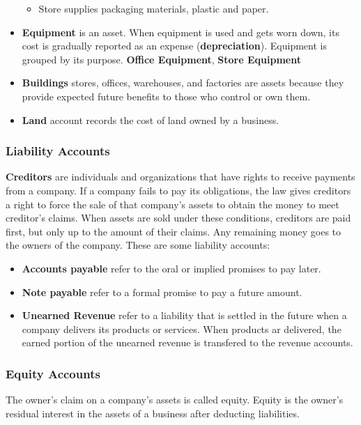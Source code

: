 \documentclass[../main.tex]{subfiles}
\begin{document}
\begin{itemize}[noitemsep]
\begin{itemize}[noitemsep]
			\item Store supplies \eg packaging materials, plastic and paper. 
		\end{itemize}
		\item \textbf{Equipment} is an asset. When equipment is used and gets 
		worn down, its cost is gradually reported as an expense 
		(\textbf{depreciation}). Equipment is grouped by its purpose. \eg 
		\textbf{Office Equipment}, \textbf{Store Equipment}
		\item \textbf{Buildings} \eg stores, offices, warehouses, and 
		factories are assets because they provide expected future benefits to 
		those who control or own them. 
		\item \textbf{Land} account records the cost of land owned by a 
		business. 
	\end{itemize}
	
	\subsubsection{Liability Accounts} 
	
	\textbf{Creditors }are individuals and 
	organizations that have rights to receive payments from a company. If a 
	company fails to pay its obligations, the law gives creditors a right to 
	force the sale of that company's assets to obtain the money to meet 
	creditor's claims. When assets are sold under these conditions, creditors 
	are paid first, but only up to the amount of their claims. Any remaining 
	money goes to the owners of the company. These are some liability accounts:
	\begin{itemize}[noitemsep]
		\item \textbf{Accounts payable} refer to the oral or implied promises 
		to pay later.
		\item \textbf{Note payable} refer to a formal promise to pay a future 
		amount. 
		\item \textbf{Unearned Revenue} refer to a liability that is settled in 
		the future when a company delivers its products or services. When 
		products ar delivered, the earned portion of the unearned revenue is 
		transfered to the revenue accounts.
	\end{itemize}
	
	\subsubsection{Equity Accounts} 
	
	The owner’s claim on a company’s assets is called equity. Equity is the 
	owner’s residual interest in the assets of a business after deducting 
	liabilities.
	
\end{document}

